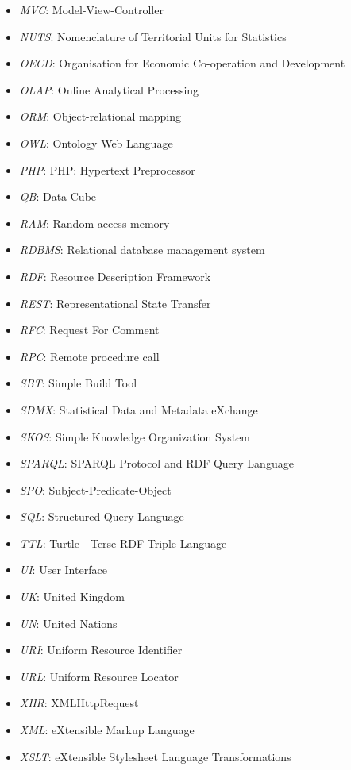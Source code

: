 \begin{itemize}
\item \emph{MVC}:	Model-View-Controller
\item \emph{NUTS}:	Nomenclature of Territorial Units for Statistics
\item \emph{OECD}:	Organisation for Economic Co-operation and Development
\item \emph{OLAP}:	Online Analytical Processing
\item \emph{ORM}:	Object-relational mapping
\item \emph{OWL}:	Ontology Web Language
\item \emph{PHP}:	PHP: Hypertext Preprocessor
\item \emph{QB}:	Data Cube
\item \emph{RAM}:	Random-access memory
\item \emph{RDBMS}:	Relational database management system
\item \emph{RDF}:	Resource Description Framework
\item \emph{REST}:	Representational State Transfer
\item \emph{RFC}:	Request For Comment
\item \emph{RPC}:	Remote procedure call 
\item \emph{SBT}:	Simple Build Tool
\item \emph{SDMX}:	Statistical Data and Metadata eXchange
\item \emph{SKOS}:	Simple Knowledge Organization System
\item \emph{SPARQL}:	SPARQL Protocol and RDF Query Language
\item \emph{SPO}:	Subject-Predicate-Object
\item \emph{SQL}:	Structured Query Language
\item \emph{TTL}:	Turtle - Terse RDF Triple Language
\item \emph{UI}:	User Interface
\item \emph{UK}:	United Kingdom
\item \emph{UN}:	United Nations
\item \emph{URI}:	Uniform Resource Identifier
\item \emph{URL}:	Uniform Resource Locator
\item \emph{XHR}:	XMLHttpRequest
\item \emph{XML}:	eXtensible Markup Language
\item \emph{XSLT}:	eXtensible Stylesheet Language Transformations
\end{itemize}